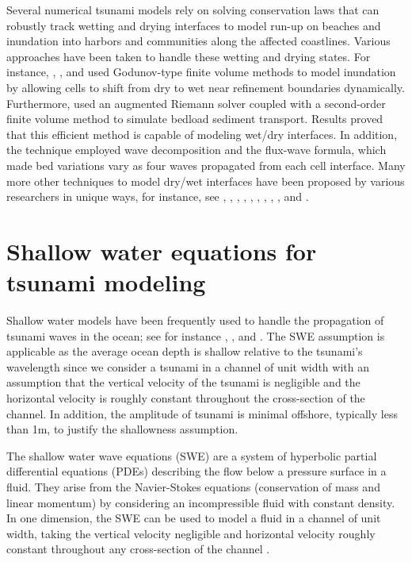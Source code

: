 \documentclass[9pt,a4paper]{article}
\begin{document}
	Several numerical tsunami models rely on solving conservation laws that can robustly track wetting and drying interfaces to model run-up on beaches and inundation into harbors and communities along the affected coastlines.  Various approaches have been taken to handle these wetting and drying states. For instance,   \citet{ge:2011}, \citet{li-ta-wa-ca-ba-ch-li:2021}, and \citet{fivser2016mass} used Godunov-type finite volume methods to model inundation by allowing cells to shift from dry to wet near refinement boundaries dynamically. Furthermore,   \citet{barzgaran2019numerical}  used an augmented Riemann solver coupled with a second-order finite volume method to simulate bedload sediment transport. Results proved that this efficient method is capable of modeling wet/dry interfaces.  In addition, the technique employed wave decomposition and the flux-wave formula, which made bed variations vary as four waves propagated from each cell interface. Many more other techniques to model dry/wet interfaces have been proposed by various researchers in unique ways, for instance, see   \citet{po:2015}, \citet{po:2018}, \citet{pe-bo-ma:2011}, \citet{toro2001shock}, \citet{chaabelasri1849simple}, \citet{nikolos2009unstructured}, \citet{huang2013well}, \citet{bi2014finite}, \citet{song2011unstructured}, and \citet{buttinger2019fast}.
	
	
	\section{Shallow water equations for tsunami modeling}
	\label{sec:sec2}
	Shallow water models have been frequently used to handle the propagation of tsunami waves in the ocean; see for instance   \citet{dutykh2007water}, \citet{le-ge-be:2011}, and \citet{dias2007dynamics}. The SWE assumption is applicable as the average ocean depth is shallow relative to the tsunami's wavelength since we consider a tsunami in a channel of unit width with an assumption that the vertical velocity of the tsunami  is negligible and the horizontal velocity is roughly constant throughout the cross-section of the channel. In addition, the amplitude of tsunami is minimal offshore, typically less than 1m, to justify the shallowness assumption. 
	
	The shallow water wave equations (SWE) are a system of hyperbolic partial differential equations (PDEs) describing the flow below a pressure surface in a fluid. They arise from the Navier-Stokes equations (conservation of mass and linear momentum) by considering an incompressible fluid with constant density.  In one dimension, the SWE  can be used to model a fluid in a channel of unit width, taking the vertical velocity negligible and horizontal velocity roughly constant throughout any cross-section of the channel \citep{ge:2008}.  
	
\end{document}
